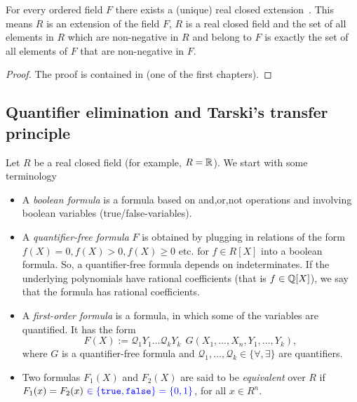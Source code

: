 \begin{theorem}
	\label{thm:extending:to:real:closed}
	For every ordered field $F$ there exists a (unique) real closed extension~. This means $R$ is an extension of the field $F$, $R$ is a real closed field and the set of all elements in $R$ which are non-negative in $R$ and belong to $F$ is exactly the set of all elements of $F$ that are non-negative in $F$. 
\end{theorem}
\begin{proof}
	The proof is contained in \cite{Bochnak:Coste:Roy:1998} (one of the first chapters). 
\end{proof}

\subsection{Quantifier elimination and Tarski's transfer principle}

Let $R$ be a real closed field (for example, $R=\mathbb{R}$).  We start with some terminology
\begin{itemize}
	\item A \emph{boolean formula} is a formula based on and,or,not operations and involving boolean variables (true/false-variables).
	\item A \emph{quantifier-free formula} $F$ is obtained by plugging in relations of the form $f(X)=0, f(X)>0, f(X) \ge 0$ etc. for $f \in R[X]$ into a boolean formula. So, a quantifier-free formula depends on indeterminates. If the underlying polynomials have rational coefficients (that is $f \in \mathbb{Q}[X]$), we say that the formula has rational coefficients.
	\item A \emph{first-order formula} is a formula, in which some of the variables are quantified. It has the form 
	\[
		F(X):= \mathcal{Q}_1 Y_1 \ldots \mathcal{Q}_k Y_k \ \ G(X_1,\ldots,X_n,Y_1,\ldots,Y_k),
	\] where $G$ is a quantifier-free formula and $\mathcal{Q}_1,\ldots,\mathcal{Q}_k \in \{ \forall, \exists\}$ are quantifiers.
	\item Two formulas $F_1(X)$ and $F_2(X)$ are said to be \emph{equivalent} over $R$ if $F_1(x)=F_2(x) \ \textcolor{blue}{\in \{\texttt{true},\texttt{false}\} = \{0,1\}}$, for all $x \in R^n$. 
\end{itemize}


